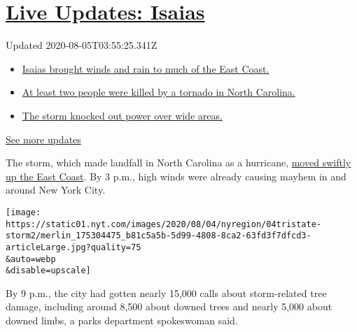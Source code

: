 \hypertarget{live-updates-isaias}{%
\section{\texorpdfstring{\href{https://www.nytimes.com/2020/08/04/us/isaias-storm-updates.html?action=click\&pgtype=Article\&state=default\&region=MAIN_CONTENT_1\&context=storylines_live_updates}{Live
Updates: Isaias}}{Live Updates: Isaias}}\label{live-updates-isaias}}

Updated 2020-08-05T03:55:25.341Z

\begin{itemize}
\tightlist
\item
  \href{https://www.nytimes.com/2020/08/04/us/isaias-storm-updates.html?action=click\&pgtype=Article\&state=default\&region=MAIN_CONTENT_1\&context=storylines_live_updates\#link-38d68049}{Isaias
  brought winds and rain to much of the East Coast.}
\item
  \href{https://www.nytimes.com/2020/08/04/us/isaias-storm-updates.html?action=click\&pgtype=Article\&state=default\&region=MAIN_CONTENT_1\&context=storylines_live_updates\#link-7961bdbc}{At
  least two people were killed by a tornado in North Carolina.}
\item
  \href{https://www.nytimes.com/2020/08/04/us/isaias-storm-updates.html?action=click\&pgtype=Article\&state=default\&region=MAIN_CONTENT_1\&context=storylines_live_updates\#link-3480f4a1}{The
  storm knocked out power over wide areas.}
\end{itemize}

\href{https://www.nytimes.com/2020/08/04/us/isaias-storm-updates.html?action=click\&pgtype=Article\&state=default\&region=MAIN_CONTENT_1\&context=storylines_live_updates}{See
more updates}

The storm, which made landfall in North Carolina as a hurricane,
\href{https://www.nytimes.com/2020/08/04/us/isaias-storm-updates.html?action=click\&module=Top\%20Stories\&pgtype=Homepage\#link-34e5d4e4}{moved
swiftly up the East Coast}. By 3 p.m., high winds were already causing
mayhem in and around New York City.

\texttt{[image: https://static01.nyt.com/images/2020/08/04/nyregion/04tristate-storm2/merlin\_175304475\_b81c5a5b-5d99-4808-8ca2-63fd3f7dfcd3-articleLarge.jpg?quality=75\\\&auto=webp\\\&disable=upscale]}

By 9 p.m., the city had gotten nearly 15,000 calls about storm-related
tree damage, including around 8,500 about downed trees and nearly 5,000
about downed limbs, a parks department spokeswoman said.

